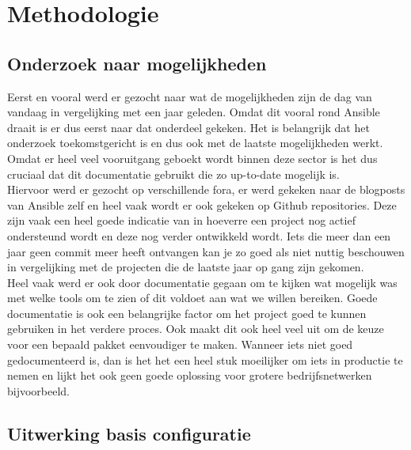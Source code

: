 
\chapter{Methodologie}
\label{ch:methodologie}

\section{Onderzoek naar mogelijkheden}
\label{ch:mogelijkheden}

Eerst en vooral werd er gezocht naar wat de mogelijkheden zijn de dag van vandaag in vergelijking met een jaar geleden. Omdat dit vooral rond Ansible draait is er dus eerst naar dat onderdeel gekeken. Het is belangrijk dat het onderzoek toekomstgericht is en dus ook met de laatste mogelijkheden werkt. Omdat er heel veel vooruitgang geboekt wordt binnen deze sector is het dus cruciaal dat dit documentatie gebruikt die zo up-to-date mogelijk is. 
\\

Hiervoor werd er gezocht op verschillende fora, er werd gekeken naar de blogposts van Ansible zelf en heel vaak wordt er ook gekeken op Github repositories. Deze zijn vaak een heel goede indicatie van in hoeverre een project nog actief ondersteund wordt en deze nog verder ontwikkeld wordt. Iets die meer dan een jaar geen commit meer heeft ontvangen kan je zo goed als niet nuttig beschouwen in vergelijking met de projecten die de laatste jaar op gang zijn gekomen. 
\\

Heel vaak werd er ook door documentatie gegaan om te kijken wat mogelijk was met welke tools om te zien of dit voldoet aan wat we willen bereiken. Goede documentatie is ook een belangrijke factor om het project goed te kunnen gebruiken in het verdere proces. Ook maakt dit ook heel veel uit om de keuze voor een bepaald pakket eenvoudiger te maken. Wanneer iets niet goed gedocumenteerd is, dan is het het een heel stuk moeilijker om iets in productie te nemen en lijkt het ook geen goede oplossing voor grotere bedrijfsnetwerken bijvoorbeeld.

\section{Uitwerking basis configuratie}
\label{ch:configuratie}

